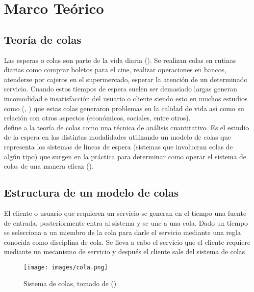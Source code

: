 \documentclass{book}
\begin{document}
\chapter{Marco Teórico}
\section{Teoría de colas}
Las esperas o colas son parte de la vida diaria (\cite{hillier2003introduccion}). Se realizan colas en rutinas diarias como comprar boletos para el cine, realizar operaciones en bancos, atenderse por cajeros en el supermercado, esperar la atención de un determinado servicio. Cuando estos tiempos de espera suelen ser demasiado largas generan incomodidad e insatisfacción del usuario o cliente siendo esto en muchos estudios como (\cite{rojas2004decision}, \cite{mayorga2017teoria}) que estas colas generaron problemas en la calidad de vida así como su relación con otros aspectos (económicos, sociales, entre otros).\\

\cite{render2006metodos} define a la teoría de colas como una técnica de análisis cuantitativo.  Es el estudio de la espera en las distintas modalidades utilizando un modelo de colas que representa los sistemas de líneas de espera (sistemas que involucran colas de algún tipo) que surgen en la práctica para determinar como operar el sistema de colas de una manera eficaz (\cite{hillier2003introduccion}).

\section{Estructura de un modelo de colas}
El cliente o usuario que requieren un servicio se generan en el tiempo una fuente de entrada, posteriormente entra al sistema y se une a una cola. Dado un tiempo se selecciona a un miembro de la cola para darle el servicio mediante una regla conocida como disciplina de cola. Se lleva a cabo el servicio que el cliente requiere mediante un mecanismo de servicio y después el cliente sale del sistema de colas

\begin{figure}[h!]
  \caption{Sistema de colas, tomado de (\cite{hillier2003introduccion})}
  {\texttt{[image: images/cola.png]}}
  \label{fig:cola}
\end{figure} 
\end{document}
